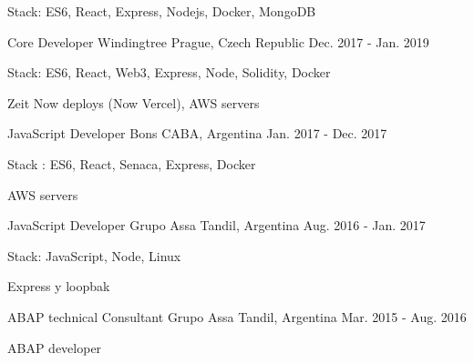 \begin{cventries}
{\begin{cvitems}
\item {Stack: ES6, React, Express, Nodejs, Docker, MongoDB}
\end{cvitems}
}
\cventry
{Core Developer} %
{Windingtree} %
{Prague, Czech Republic} %
{Dec. 2017 - Jan. 2019} %
{ %
\begin{cvitems}
\item {Stack: ES6, React, Web3, Express, Node, Solidity, Docker}
\item {Zeit Now deploys (Now Vercel), AWS servers}
\end{cvitems}
}
\cventry
{JavaScript Developer} %
{Bons} %
{CABA, Argentina} %
{Jan. 2017 - Dec. 2017} %
{ %
\begin{cvitems}
\item {Stack : ES6, React, Senaca, Express, Docker}
\item {AWS servers}
\end{cvitems}
}
\cventry
{JavaScript Developer} %
{Grupo Assa} %
{Tandil, Argentina} %
{Aug. 2016 - Jan. 2017} %
{ %
\begin{cvitems}
\item {Stack: JavaScript, Node, Linux}
\item {Express y loopbak}
\end{cvitems}
}

\cventry
{ABAP technical Consultant} %
{Grupo Assa} %
{Tandil, Argentina} %
{Mar. 2015 - Aug. 2016} %
{ %
\begin{cvitems}
\item {ABAP developer}
\end{cvitems}
}

\end{cventries}
